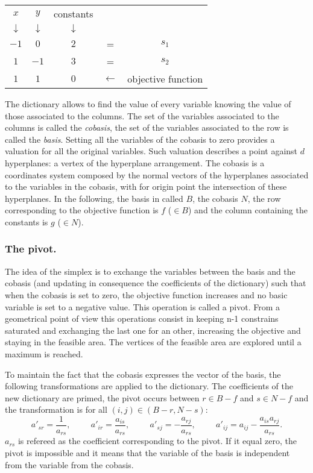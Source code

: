 \begin{example}
	\begin{tabular}{| c | c || c || c c |}
	\hline	
	$x$ & $y$ & constants & & \\
	$\downarrow$ &$\downarrow$ &$\downarrow$ & & \\
	\hline
	\hline	
   	$-1$ & $0$ & $2$ & = & $s_1$\\ \hline	
   	$1$ & $-1$ & $3$ & = & $s_2$\\ \hline \hline	
   	$1$ & $1$ & $0$ & $\leftarrow$ & objective function \\
   	\hline	
 	\end{tabular}
	\label{lp3}
\end{example}

The dictionary allows to find the value of every variable knowing the value of those associated to the columns. The set of the variables associated to the columns is called the \emph{cobasis}, the set of the variables associated to the row is called the \emph{basis}. Setting all the variables of the cobasis to zero provides a valuation for all the original variables. Such valuation describes a point against $d$ hyperplanes: a vertex of the hyperplane arrangement. The cobasis is a coordinates system composed by the normal vectors of the hyperplanes associated to the variables in the cobasis, with for origin point the intersection of these hyperplanes.
In the following, the basis in called $B$, the cobasis $N$, the row corresponding to the objective function is $f$ ($\in B$) and the column containing the constants is $g$ ($\in N$).  

\subsubsection{The pivot.} 
The idea of the simplex is to exchange the variables between the basis and the cobasis (and updating in consequence the coefficients of the dictionary) such that when the cobasis is set to zero, the objective function increases and no basic variable is set to a negative value. This operation is called a pivot. From a geometrical point of view this operations consist in keeping n-1 constrains saturated and exchanging the last one for an other, increasing the objective and staying in the feasible area. The vertices of the feasible area are explored until a maximum is reached.

To maintain the fact that the cobasis expresses the vector of the basis, the following transformations are applied to the dictionary. The coefficients of the new dictionary are primed, the pivot occurs between $r \in B-f$ and $s \in N-f$ and the transformation is for all $(i,j)\in (B-r,N-s)$:
$$ 
a'_{sr}=\frac{1}{a_{rs}}, \hspace{1cm} a'_{ir}=\frac{a_{is}}{a_{rs}}, \hspace{1cm} a'_{sj}=-\frac{a_{rj}}{a_{rs}}, \hspace{1cm} a'_{ij}=a_{ij}-\frac{a_{is}a_{rj}}{a_{rs}}.
$$
$a_{rs}$ is refereed as the coefficient corresponding to the pivot. If it equal zero, the pivot is impossible and it means that the variable of the basis is independent from the variable from the cobasis.

